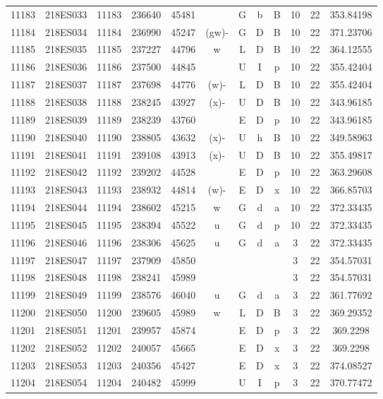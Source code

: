 \begin{tabular}{|*{12}{c|}}
11183 & 218ES033 & 11183 & 236640 & 45481 &  & G & b & B & 10 & 22 & 353.84198 \\ 
11184 & 218ES034 & 11184 & 236990 & 45247 & (gw)- & G & D & B & 10 & 22 & 371.23706 \\ 
11185 & 218ES035 & 11185 & 237227 & 44796 & w & L & D & B & 10 & 22 & 364.12555 \\ 
11186 & 218ES036 & 11186 & 237500 & 44845 &  & U & I & p & 10 & 22 & 355.42404 \\ 
11187 & 218ES037 & 11187 & 237698 & 44776 & (w)- & L & D & B & 10 & 22 & 355.42404 \\ 
11188 & 218ES038 & 11188 & 238245 & 43927 & (x)- & U & D & B & 10 & 22 & 343.96185 \\ 
11189 & 218ES039 & 11189 & 238239 & 43760 &  & E & D & p & 10 & 22 & 343.96185 \\ 
11190 & 218ES040 & 11190 & 238805 & 43632 & (x)- & U & h & B & 10 & 22 & 349.58963 \\ 
11191 & 218ES041 & 11191 & 239108 & 43913 & (x)- & U & D & B & 10 & 22 & 355.49817 \\ 
11192 & 218ES042 & 11192 & 239202 & 44528 &  & E & D & p & 10 & 22 & 363.29608 \\ 
11193 & 218ES043 & 11193 & 238932 & 44814 & (w)- & E & D & x & 10 & 22 & 366.85703 \\ 
11194 & 218ES044 & 11194 & 238602 & 45215 & w & G & d & a & 10 & 22 & 372.33435 \\ 
11195 & 218ES045 & 11195 & 238394 & 45522 & u & G & d & p & 10 & 22 & 372.33435 \\ 
11196 & 218ES046 & 11196 & 238306 & 45625 & u & G & d & a & 3 & 22 & 372.33435 \\ 
11197 & 218ES047 & 11197 & 237909 & 45850 &  &  &  &  & 3 & 22 & 354.57031 \\ 
11198 & 218ES048 & 11198 & 238241 & 45989 &  &  &  &  & 3 & 22 & 354.57031 \\ 
11199 & 218ES049 & 11199 & 238576 & 46040 & u & G & d & a & 3 & 22 & 361.77692 \\ 
11200 & 218ES050 & 11200 & 239605 & 45989 & w & L & D & B & 3 & 22 & 369.29352 \\ 
11201 & 218ES051 & 11201 & 239957 & 45874 &  & E & D & p & 3 & 22 & 369.2298 \\ 
11202 & 218ES052 & 11202 & 240057 & 45665 &  & E & D & x & 3 & 22 & 369.2298 \\ 
11203 & 218ES053 & 11203 & 240356 & 45427 &  & E & D & x & 3 & 22 & 374.08527 \\ 
11204 & 218ES054 & 11204 & 240482 & 45999 &  & U & I & p & 3 & 22 & 370.77472 \\ 

\end{tabular}
